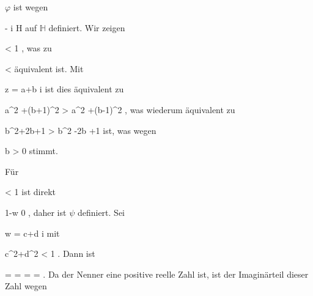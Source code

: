 $\varphi$ ist wegen

\mavergleichskette
{\vergleichskette
{ - { \mathrm i}
}
{ \notin }{ {\mathbb H}
}
{  }{
}
{    }{
}
{   }{
}
}
{}{}{}
auf ${\mathbb H}$ definiert. Wir zeigen

\mavergleichskettedisp
{\vergleichskette
{ 
}
{ <} { 1
}
{ } {
}
{ } {
}
{ } {
}
}
{}{}{,}
was zu

\mavergleichskettedisp
{\vergleichskette
{ 
}
{ <} { 
}
{ } {
}
{ } {
}
{ } {
}
}
{}{}{}
äquivalent ist. Mit

\mavergleichskette
{\vergleichskette
{z
}
{ = }{ a+b { \mathrm i}
}
{  }{
}
{    }{
}
{   }{
}
}
{}{}{}
ist dies äquivalent zu

\mavergleichskettedisp
{\vergleichskette
{ a^2 +(b+1)^2
}
{ >} { a^2 +(b-1)^2
}
{ } {
}
{ } {
}
{ } {
}
}
{}{}{,}
was wiederum äquivalent zu

\mavergleichskettedisp
{\vergleichskette
{ b^2+2b+1
}
{ >} { b^2 -2b +1
}
{ } {
}
{ } {
}
{ } {
}
}
{}{}{}
ist, was wegen

\mavergleichskette
{\vergleichskette
{ b
}
{ > }{ 0
}
{  }{
}
{    }{
}
{   }{
}
}
{}{}{}
stimmt.

Für

\mavergleichskette
{\vergleichskette
{ 
}
{ < }{ 1
}
{  }{
}
{    }{
}
{   }{
}
}
{}{}{}
ist direkt

\mavergleichskette
{\vergleichskette
{ 1-w
}
{ \neq }{ 0
}
{  }{
}
{    }{
}
{   }{
}
}
{}{}{,}
daher ist $\psi$ definiert. Sei

\mavergleichskette
{\vergleichskette
{ w
}
{ = }{ c+d  { \mathrm i}
}
{  }{
}
{    }{
}
{   }{
}
}
{}{}{}
mit

\mavergleichskette
{\vergleichskette
{ c^2+d^2
}
{ < }{ 1
}
{  }{
}
{    }{
}
{   }{
}
}
{}{}{.}
Dann ist

\mavergleichskettealignhandlinks
{\vergleichskettealignhandlinks
{ {  }
}
{ =} { {  }
}
{ =} { {  }
}
{ =} { {  } 
}
{ =} { {  }
}
}
{}
{}{.}
Da der Nenner eine positive reelle Zahl ist, ist der Imaginärteil dieser Zahl wegen

